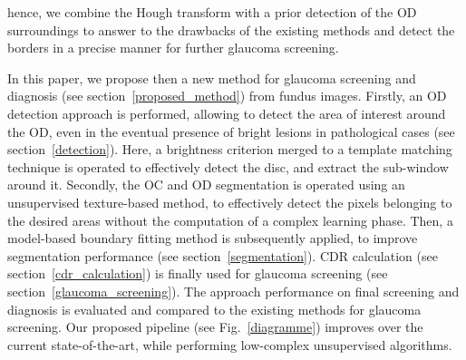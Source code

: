 hence, we combine the Hough transform with a prior detection of the OD surroundings to answer to the drawbacks of the existing methods and detect the borders in a precise manner for further glaucoma screening.

In this paper, we propose then a new method for glaucoma screening and diagnosis (see \mbox{section \ref{proposed_method}}) from fundus images. Firstly, an OD detection approach is performed, allowing to detect the area of interest around the OD, even in the eventual presence of bright lesions in pathological cases (see \mbox{section \ref{detection}}). Here, a brightness criterion merged to a template matching technique is operated to effectively detect the disc, and extract the sub-window around it. Secondly, the OC and OD segmentation is operated using an unsupervised texture-based method, to effectively detect the pixels belonging to the desired areas without the computation of a complex learning phase. Then, a model-based boundary fitting method is subsequently applied, to improve segmentation performance (see \mbox{section \ref{segmentation}}). CDR calculation (see \mbox{section \ref{cdr_calculation}}) is finally used for glaucoma screening (see \mbox{section \ref{glaucoma_screening}}). The approach performance on final screening and diagnosis is evaluated and compared to the existing methods for glaucoma screening. Our proposed pipeline (see \mbox{Fig. \ref{diagramme}}) improves over the current state-of-the-art, while performing low-complex unsupervised algorithms.
